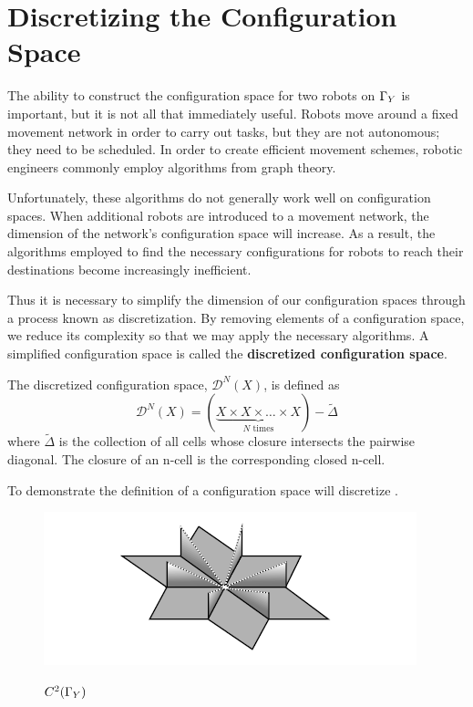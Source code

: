 \chapter{Discretizing the Configuration Space}
The ability to construct the configuration space for two robots on $\Gamma_Y$ is important, but it is not all that immediately useful. Robots move around a fixed movement network in order to carry out tasks, but they are not autonomous; they need to be scheduled. In order to create efficient movement schemes, robotic engineers commonly employ algorithms from graph theory.

Unfortunately, these algorithms do not generally work well on configuration spaces. When additional robots are introduced to a movement network, the dimension of the network's configuration space will increase. As a result, the algorithms employed to find the necessary configurations for robots to reach their destinations become increasingly inefficient. 

Thus it is necessary to simplify the dimension of our configuration spaces through a process known as discretization. By removing elements of a configuration space, we reduce its complexity so that we may apply the necessary algorithms. A simplified configuration space is called the \textbf{discretized configuration space}.


\begin{defn}
The discretized configuration space, $\mathcal{D}^N( X)$, is defined as $$\mathcal{D}^N(X) = (\underbrace{X\times X \times \dots \times X}_{N\text{ times}}) - \tilde{\Delta} $$ where $\tilde{\Delta}$ is the collection of all cells whose closure intersects the pairwise diagonal. The closure of an n-cell is the corresponding closed n-cell.
\end{defn}

To demonstrate the definition of a configuration space will discretize \C.


\begin{figure}[h]
\centering
\caption{$C^2(\Gamma_Y)$}
\includegraphics[scale=1]{Presentation/Config.jpg}
\label{fig:config4}
\end{figure}

